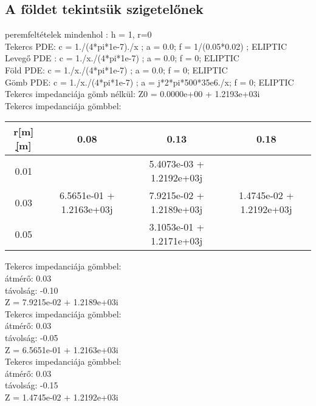 \subsection{A földet tekintsük szigetelőnek}

peremfeltételek mindenhol : h = 1, r=0\\
Tekercs PDE: c = 1./(4*pi*1e-7)./x ; a = 0.0; f = 1/(0.05*0.02) ; ELIPTIC \\
Levegő PDE : c = 1./x./(4*pi*1e-7) ; a = 0.0; f = 0; ELIPTIC \\
Föld PDE:    c = 1./x./(4*pi*1e-7) ; a = 0.0; f = 0; ELIPTIC \\
Gömb PDE:    c = 1./x./(4*pi*1e-7) ; a = j*2*pi*500*35e6./x; f = 0; ELIPTIC \\

Tekercs impedanciája gömb nélkül: Z0 = 0.0000e+00 + 1.2193e+03i\\

Tekercs impedanciája gömbbel:\\
\begin{tabular}{|c|c|c|c|}
    \hline
    r[m]\d[m] & 0.08                     & 0.13                     & 0.18                     \\
    \hline
    \hline
    0.01      &                          & 5.4073e-03 + 1.2192e+03j &                          \\
    \hline
    0.03      & 6.5651e-01 + 1.2163e+03j & 7.9215e-02 + 1.2189e+03j & 1.4745e-02 + 1.2192e+03j \\
    \hline
    0.05      &                          & 3.1053e-01 + 1.2171e+03j &                          \\
    \hline
\end{tabular}

Tekercs impedanciája gömbbel:\\
átmérő: 0.03 \\
távolság: -0.10 \\
Z = 7.9215e-02 + 1.2189e+03i\\

Tekercs impedanciája gömbbel:\\
átmérő: 0.03 \\
távolság: -0.05 \\
Z = 6.5651e-01 + 1.2163e+03i\\

Tekercs impedanciája gömbbel:\\
átmérő: 0.03 \\
távolság: -0.15 \\
Z = 1.4745e-02 + 1.2192e+03i \\

